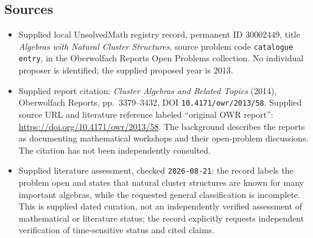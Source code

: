 \documentclass[11pt]{article}
\begin{document}
\subsection{Sources}
\begin{itemize}
\item Supplied local UnsolvedMath registry record, permanent ID \(30002449\), title \emph{Algebras with Natural Cluster Structures}, source problem code \texttt{catalogue entry}, in the Oberwolfach Reports Open Problems collection. No individual proposer is identified; the supplied proposed year is 2013.
\item Supplied report citation: \emph{Cluster Algebras and Related Topics} (2014), Oberwolfach Reports, pp.\ 3379--3432, DOI \texttt{10.4171/owr/2013/58}. Supplied source URL and literature reference labeled ``original OWR report'': \url{https://doi.org/10.4171/owr/2013/58}. The background describes the reports as documenting mathematical workshops and their open-problem discussions. The citation has not been independently consulted.
\item Supplied literature assessment, checked \texttt{2026-08-21}: the record labels the problem open and states that natural cluster structures are known for many important algebras, while the requested general classification is incomplete. This is supplied dated curation, not an independently verified assessment of mathematical or literature status; the record explicitly requests independent verification of time-sensitive status and cited claims.
\end{itemize}
\end{document}

